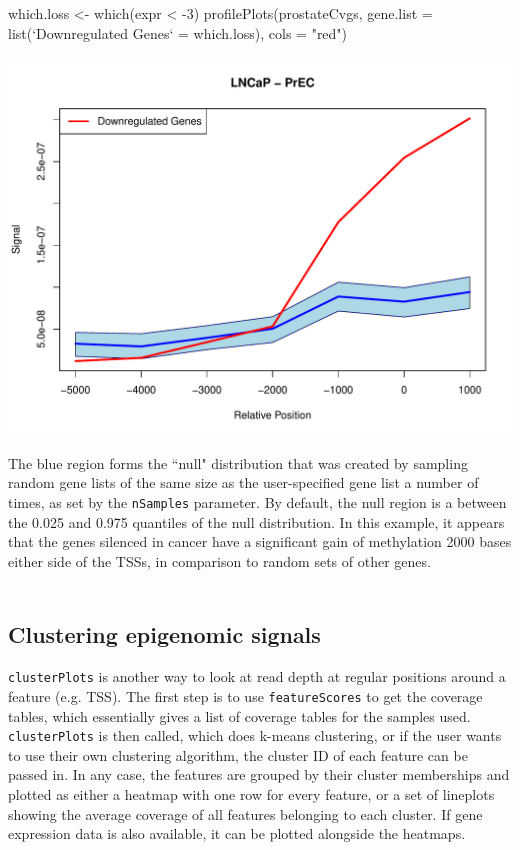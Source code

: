 \begin{Schunk}
\begin{Sinput}
 which.loss <- which(expr < -3)
 profilePlots(prostateCvgs, gene.list = list(`Downregulated Genes` = which.loss), 
     cols = "red")
\end{Sinput}
\end{Schunk}
\includegraphics{visualisations-profPlots}


\noindent The blue region forms the ``null" distribution that was created by sampling random gene lists of the same size as the user-specified gene list a number of times, as set by the \texttt{nSamples} parameter. By default, the null region is a between the 0.025 and 0.975 quantiles of the null distribution. In this example, it appears that the genes silenced in cancer have a significant gain of methylation 2000 bases either side of the TSSs, in comparison to random sets of other genes.
\ \\ \ \\

\subsection{Clustering epigenomic signals}

\texttt{clusterPlots} is another way to look at read depth at regular positions around a feature (e.g. TSS). The first step is to use \texttt{featureScores} to get the coverage tables, which essentially gives a list of coverage tables for the samples used. \texttt{clusterPlots} is then called, which does k-means clustering, or if the user wants to use their own clustering algorithm, the cluster ID of each feature can be passed in. In any case, the features are grouped by their cluster memberships and plotted as either a heatmap with one row for every feature, or a set of lineplots showing the average coverage of all features belonging to each cluster. If gene expression data is also available, it can be plotted alongside the heatmaps.


